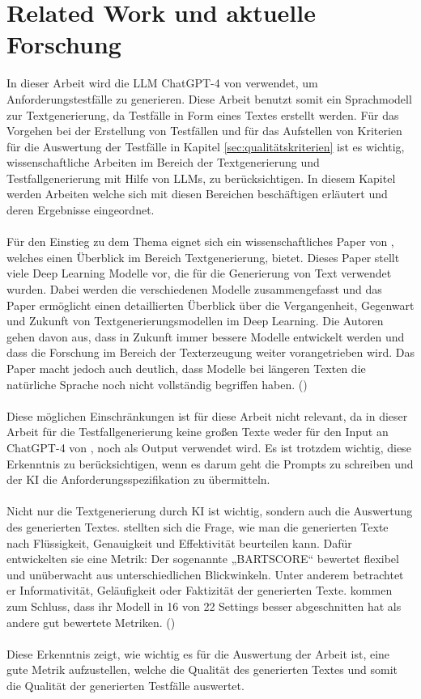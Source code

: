 \documentclass[12pt,toc=bib,toc=listof]{scrreprt}
\begin{document}
\chapter{Related Work und aktuelle Forschung} %
\label{sec:relatedWorkUndAktuelleForschung}
In dieser Arbeit wird die LLM ChatGPT-4 von \textcite{OpenAI2025} verwendet, um Anforderungstestfälle zu generieren. Diese Arbeit benutzt somit ein Sprachmodell zur Textgenerierung, da Testfälle in Form eines Textes erstellt werden. Für das Vorgehen bei der Erstellung von Testfällen und für das Aufstellen von Kriterien für die Auswertung der Testfälle in Kapitel \ref{sec:qualitätskriterien} ist es wichtig, wissenschaftliche Arbeiten im Bereich der Textgenerierung und Testfallgenerierung mit Hilfe von LLMs, zu berücksichtigen. In diesem Kapitel werden Arbeiten welche sich mit diesen Bereichen beschäftigen erläutert und deren Ergebnisse eingeordnet.\\
\\
Für den Einstieg zu dem Thema eignet sich ein wissenschaftliches Paper von \textcite{Iqbal2022}, welches einen Überblick im Bereich Textgenerierung, bietet. Dieses Paper stellt viele Deep Learning Modelle vor, die für die Generierung von Text verwendet wurden. Dabei werden die verschiedenen Modelle zusammengefasst und das Paper ermöglicht einen detaillierten Überblick über die Vergangenheit, Gegenwart und Zukunft von Textgenerierungsmodellen im Deep Learning. Die Autoren \textcite{Iqbal2022} gehen davon aus, dass in Zukunft immer bessere Modelle entwickelt werden und dass die Forschung im Bereich der Texterzeugung weiter vorangetrieben wird. Das Paper macht jedoch auch deutlich, dass Modelle bei längeren Texten die natürliche Sprache noch nicht vollständig begriffen haben. (\cite{Iqbal2022})\\
\\
Diese möglichen Einschränkungen ist für diese Arbeit nicht relevant, da in dieser Arbeit für die Testfallgenerierung keine großen Texte weder für den Input an ChatGPT-4 von \textcite{OpenAI2025}, noch als Output verwendet wird. Es ist trotzdem wichtig, diese Erkenntnis zu berücksichtigen, wenn es darum geht die Prompts zu schreiben und der KI die Anforderungsspezifikation zu übermitteln.\\
\\
Nicht nur die Textgenerierung durch KI ist wichtig, sondern auch die Auswertung des generierten Textes. \textcite{Yuan2021} stellten sich die Frage, wie man die generierten Texte nach Flüssigkeit, Genauigkeit und Effektivität beurteilen kann. Dafür entwickelten sie eine Metrik: Der sogenannte „BARTSCORE“ bewertet flexibel und unüberwacht aus unterschiedlichen Blickwinkeln. Unter anderem betrachtet er Informativität, Geläufigkeit oder Faktizität der generierten Texte. \textcite{Yuan2021} kommen zum Schluss, dass ihr Modell in 16 von 22 Settings besser abgeschnitten hat als andere gut bewertete Metriken. (\cite{Yuan2021})\\
\\
Diese Erkenntnis zeigt, wie wichtig es für die Auswertung der Arbeit ist, eine gute Metrik aufzustellen, welche die Qualität des generierten Textes und somit die Qualität der generierten Testfälle auswertet.\\
\newpage
\end{document}
